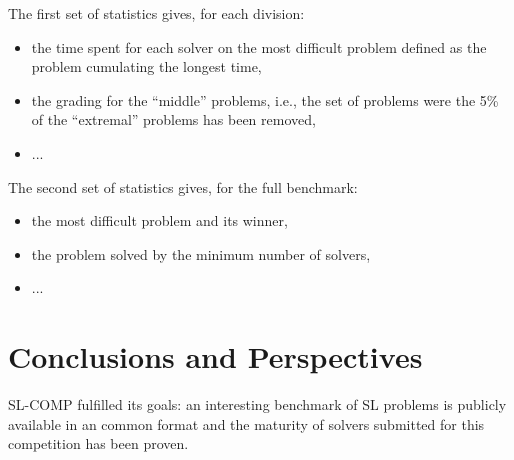 \documentclass{llncs}
\begin{document}
The first set of statistics gives, for each division:
\begin{itemize}
\item the time spent for each solver on the most difficult problem defined as the problem cumulating the longest time,
\item the grading for the ``middle'' problems, i.e., the set of problems were the 5\% of the ``extremal'' problems has been removed,
\item ...
\end{itemize}

The second set of statistics gives, for the full benchmark:
\begin{itemize}
\item the most difficult problem and its winner,
\item the problem solved by the minimum number of solvers,
\item ...
\end{itemize}



\section{Conclusions and Perspectives}

SL-COMP fulfilled its goals:
an interesting benchmark of SL problems is publicly available in an common format and
the maturity of solvers submitted for this competition  has been proven.
\end{document}
